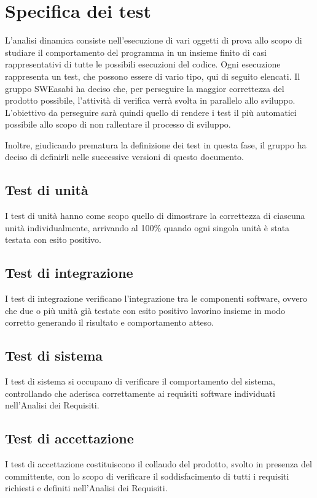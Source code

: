 \chapter{Specifica dei test}\label{specifica-dei-test}
L'analisi dinamica consiste nell'esecuzione di vari oggetti di prova allo scopo di studiare il comportamento del programma in un insieme finito di casi rappresentativi di tutte le possibili esecuzioni del codice. Ogni esecuzione rappresenta un test, che possono essere di vario tipo, qui di seguito elencati.
Il gruppo SWEasabi ha deciso che, per perseguire la maggior correttezza del prodotto possibile, l'attività di verifica verrà svolta in parallelo allo sviluppo. L'obiettivo da perseguire sarà quindi quello di rendere i test il più automatici possibile allo scopo di non rallentare il processo di sviluppo.

Inoltre, giudicando prematura la definizione dei test in questa fase, il gruppo ha deciso di definirli nelle successive versioni di questo documento.

\section{Test di unità}
I test di unità hanno come scopo quello di dimostrare la correttezza di ciascuna unità individualmente, arrivando al 100\% quando ogni singola unità è stata testata con esito positivo. 

\section{Test di integrazione}
I test di integrazione verificano l'integrazione tra le componenti software, ovvero che due o più unità già testate con esito positivo lavorino insieme in modo corretto generando il risultato e comportamento atteso.

\section{Test di sistema}
I test di sistema si occupano di verificare il comportamento del sistema, controllando che aderisca correttamente ai requisiti software individuati nell'Analisi dei Requisiti.

\section{Test di accettazione}
I test di accettazione costituiscono il collaudo del prodotto, svolto in presenza del committente, con lo scopo di verificare il soddisfacimento di tutti i requisiti richiesti e definiti nell'Analisi dei Requisiti.

